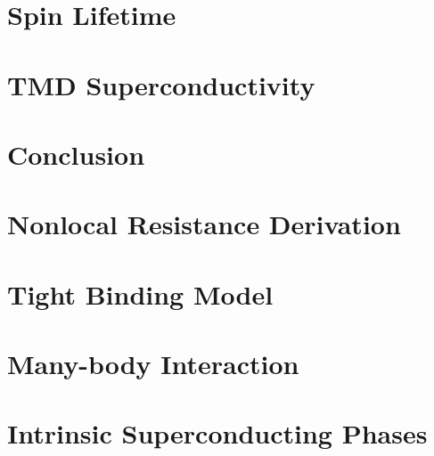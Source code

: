 \documentclass[oneside,12pt]{memoir}
\begin{document}
  \frontmatter{}
  
  
  
  \pagestyle{thesis}
  
  
  
  \newpage
  \tableofcontents
  \newpage
  \listoffigures
  \mainmatter{}
  

  \chapter{Spin Lifetime}\label{s:spin-lifetime}
  
  
  
  

  \chapter{TMD Superconductivity}\label{s:dichalcogenides}
  
  
  
  
  

  \chapter{Conclusion}
  

  \begin{appendices}

    \chapter{Nonlocal Resistance Derivation}
    

    \chapter{Tight Binding Model}
    

    \chapter{Many-body Interaction}
    

    \chapter{Intrinsic Superconducting Phases}
    
    
  \end{appendices}
  \backmatter{}
  \SingleSpacing{}
  \printbibliography{}
\end{document}

